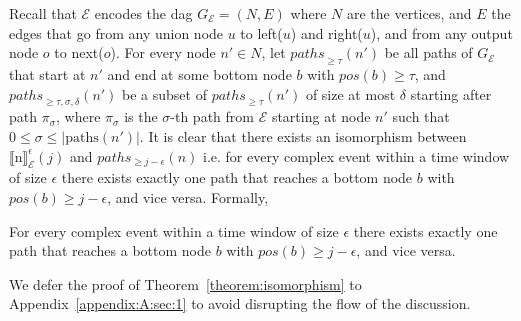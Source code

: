 Recall that $\mathcal{E}$ encodes the \acrshort{dag} $G_{\mathcal{E}} = (N, E)$ where $N$ are the vertices, and $E$ the edges that go from any union node $u$ to left($u$) and right($u$), and from any output node $o$ to next($o$). For every node $n' \in N$, let ${paths}_{\ge \tau}(n')$ be all paths of $G_{\mathcal{E}}$ that start at $n'$ and end at some bottom node $b$ with $pos(b) \ge \tau$, and ${paths}_{\ge \tau, \sigma, \delta}(n')$ be a subset of ${paths}_{\ge \tau}(n')$ of size at most $\delta$ starting after path $\pi_{\sigma}$, where $\pi_{\sigma}$ is the $\sigma$-th path from $\mathcal{E}$ starting at node $n'$ such that $0 \le \sigma \le |\text{paths}(n')|$. It is clear that there exists an isomorphism between ${\llbracket \text{n} \rrbracket}^{\epsilon}_{\mathcal{E}}(j)$ and $paths_{\ge j - \epsilon}(n)$ i.e. for every complex event within a time window of size $\epsilon$ there exists exactly one path that reaches a bottom node $b$ with $pos(b) \ge j - \epsilon$, and vice versa. Formally,

\begin{theorem}\label{theorem:isomorphism}
For every complex event within a time window of size $\epsilon$ there exists exactly one path that reaches a bottom node $b$ with $pos(b) \ge j - \epsilon$, and vice versa.
\end{theorem}

We defer the proof of Theorem~\ref{theorem:isomorphism} to Appendix~\ref{appendix:A:sec:1} to avoid disrupting the flow of the discussion.

